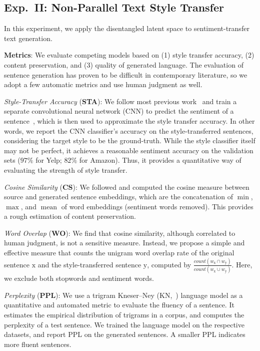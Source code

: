 \documentclass[11pt,a4paper]{article}
\begin{document}
\subsection{Exp.~II: Non-Parallel Text Style Transfer}
In this experiment, we apply the disentangled latent space to sentiment-transfer text generation.

\textbf{Metrics}: We evaluate competing models based on (1) style transfer accuracy, (2) content preservation, and (3) quality of generated language. The evaluation of sentence generation has proven to be difficult in contemporary literature, so we adopt a few automatic metrics and use human judgment as well.

\textit{Style-Transfer Accuracy} (\textbf{STA}):
We follow most previous work~\cite{hu2017toward,shen2017style,fu2018style} and train a separate convolutional neural network (CNN) to predict the sentiment of a sentence~\cite{kim2014convolutional}, which is then used to approximate the style transfer accuracy.
In other words, we report the CNN classifier's accuracy on the style-transferred sentences, considering the target style to be the ground-truth.
While the style classifier itself may not be perfect, it achieves a reasonable sentiment accuracy on the validation sets ($97\%$ for Yelp; $82\%$ for Amazon).
Thus, it provides a quantitative way of evaluating the strength of style transfer.

\textit{Cosine Similarity} (\textbf{CS}):
We followed \citet{fu2018style} and computed the cosine measure between source and generated sentence embeddings, which are the concatenation of $\operatorname{min}$, $\operatorname{max}$, and $\operatorname{mean}$ of word embeddings (sentiment words removed).
This provides a rough estimation of content preservation.

\textit{Word Overlap} (\textbf{WO}):
We find that cosine similarity, although correlated to human judgment, is not a sensitive measure.
Instead, we propose a simple and effective measure that counts the unigram word overlap rate of the original sentence $\mathrm x$ and the style-transferred sentence $\mathrm y$, computed by $\frac{count(w_{\mathrm x} \cap w_{\mathrm y})}{count(w_{\mathrm x} \cup w_{\mathrm y})}$.
Here, we exclude both stopwords and sentiment words.


\textit{Perplexity} (\textbf{PPL}): We use a trigram Kneser--Ney (KN,~\citeyear{kneser1995improved}) language model as a quantitative and automated metric to evaluate the fluency of a sentence.
It estimates the empirical distribution of trigrams in a corpus, and computes the perplexity of a test sentence.
We trained the language model on the respective datasets, and report PPL on the generated sentences. A smaller PPL indicates more fluent sentences.
\end{document}
